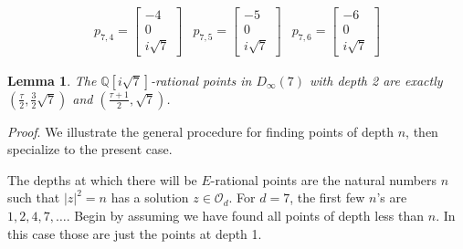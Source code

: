 \documentclass{article}[12pt]
\newcommand{\Q}{\mathbb{Q}}
\newtheorem{lem}{Lemma}%
\newcommand{\Pf}{{\em Proof}. }
\begin{document}
$$\begin{array}{cccccc}
  p_{7,4}=\left[ \begin{array}{c} -4 \\ 0 \\ i\sqrt{7} \end{array}\right]  &
  p_{7,5}=\left[ \begin{array}{c} -5 \\ 0 \\ i\sqrt{7} \end{array}\right]  &
  p_{7,6}=\left[ \begin{array}{c} -6 \\ 0 \\ i\sqrt{7} \end{array}\right]    
  \end{array}
$$

\begin{lem}\label{depth2points} The $\Q[i\sqrt{7}]$-rational points in $D_\infty(7)$ with depth 2 are exactly $(\frac{\tau}{2},\frac{3}{2}\sqrt{7})$ and $(\frac{\tau+1}{2},\sqrt{7})$.
\end{lem}

\Pf We illustrate the general procedure for finding points of depth $n$, then specialize to the present  case.

The depths at which there will be $E$-rational points are the natural numbers $n$ such that $|z|^2 = n$ has a solution $z\in\mathcal{O}_d$.  For $d=7$, the first few $n$'s are $1,2,4,7,\ldots$.  
Begin by assuming we have found all points of depth less than $n$.  In this case those are just the points at depth 1.
\end{document}
